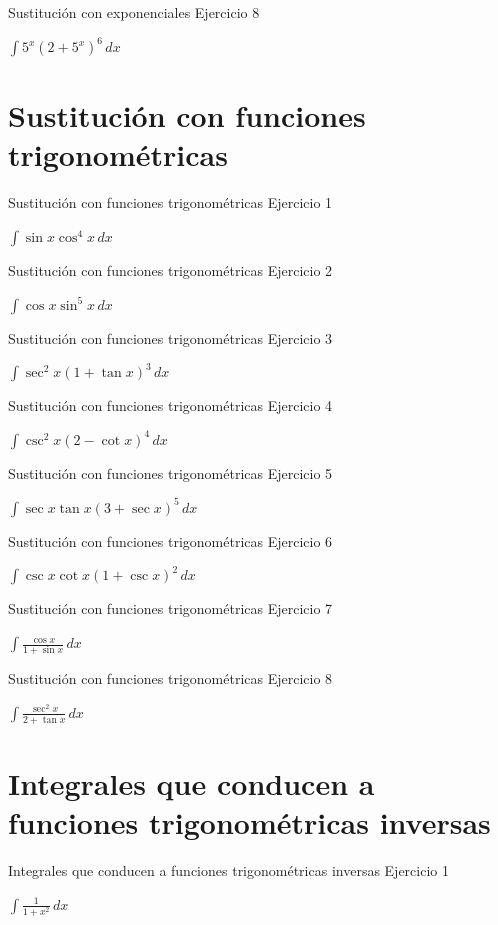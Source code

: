 \documentclass[10pt,aspectratio=169]{beamer}
\newcommand{\ejercicio}[1]{%
  \begin{center}
  \vfill
  {\fontsize{24}{30}\selectfont #1}
  \vfill
  \end{center}
}
\begin{document}
\begin{frame}{Sustitución con exponenciales}
\small Ejercicio 8
\ejercicio{$\displaystyle \int 5^x(2+5^x)^6\,dx$}
\end{frame}

\section{Sustitución con funciones trigonométricas}
\begin{frame}{Sustitución con funciones trigonométricas}
\small Ejercicio 1
\ejercicio{$\displaystyle \int\sin x\cos^4x\,dx$}
\end{frame}

\begin{frame}{Sustitución con funciones trigonométricas}
\small Ejercicio 2
\ejercicio{$\displaystyle \int\cos x\sin^5x\,dx$}
\end{frame}

\begin{frame}{Sustitución con funciones trigonométricas}
\small Ejercicio 3
\ejercicio{$\displaystyle \int\sec^2x(1+\tan x)^3\,dx$}
\end{frame}

\begin{frame}{Sustitución con funciones trigonométricas}
\small Ejercicio 4
\ejercicio{$\displaystyle \int\csc^2x(2-\cot x)^4\,dx$}
\end{frame}

\begin{frame}{Sustitución con funciones trigonométricas}
\small Ejercicio 5
\ejercicio{$\displaystyle \int\sec x\tan x(3+\sec x)^5\,dx$}
\end{frame}

\begin{frame}{Sustitución con funciones trigonométricas}
\small Ejercicio 6
\ejercicio{$\displaystyle \int\csc x\cot x(1+\csc x)^2\,dx$}
\end{frame}

\begin{frame}{Sustitución con funciones trigonométricas}
\small Ejercicio 7
\ejercicio{$\displaystyle \int\frac{\cos x}{1+\sin x}\,dx$}
\end{frame}

\begin{frame}{Sustitución con funciones trigonométricas}
\small Ejercicio 8
\ejercicio{$\displaystyle \int\frac{\sec^2x}{2+\tan x}\,dx$}
\end{frame}

\section{Integrales que conducen a funciones trigonométricas inversas}
\begin{frame}{Integrales que conducen a funciones trigonométricas inversas}
\small Ejercicio 1
\ejercicio{$\displaystyle \int\frac{1}{1+x^2}\,dx$}
\end{frame}
\end{document}
